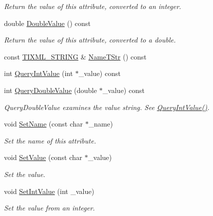 \begin{DoxyCompactItemize}
\begin{DoxyCompactList}\small\item\em Return the value of this attribute, converted to an integer. \end{DoxyCompactList}\item 
double \hyperlink{class_ti_xml_attribute_a2880ddef53fc7522c99535273954d230}{Double\-Value} () const 
\begin{DoxyCompactList}\small\item\em Return the value of this attribute, converted to a double. \end{DoxyCompactList}\item 
const \hyperlink{tinyxml_8h_a92bada05fd84d9a0c9a5bbe53de26887}{T\-I\-X\-M\-L\-\_\-\-S\-T\-R\-I\-N\-G} \& \hyperlink{class_ti_xml_attribute_a64cee17bceb8232eb0736d26dd082d79}{Name\-T\-Str} () const 
\item 
int \hyperlink{class_ti_xml_attribute_ad6c93088ee21af41a107931223339344}{Query\-Int\-Value} (int $\ast$\-\_\-value) const 
\item 
int \hyperlink{class_ti_xml_attribute_ac87b2a8489906a5d7aa2875f20be3513}{Query\-Double\-Value} (double $\ast$\-\_\-value) const 
\begin{DoxyCompactList}\small\item\em Query\-Double\-Value examines the value string. See \hyperlink{class_ti_xml_attribute_ad6c93088ee21af41a107931223339344}{Query\-Int\-Value()}. \end{DoxyCompactList}\item 
void \hyperlink{class_ti_xml_attribute_ab7fa3d21ff8d7c5764cf9af15b667a99}{Set\-Name} (const char $\ast$\-\_\-name)
\begin{DoxyCompactList}\small\item\em Set the name of this attribute. \end{DoxyCompactList}\item 
void \hyperlink{class_ti_xml_attribute_a2dae44178f668b3cb48101be4f2236a0}{Set\-Value} (const char $\ast$\-\_\-value)
\begin{DoxyCompactList}\small\item\em Set the value. \end{DoxyCompactList}\item 
void \hyperlink{class_ti_xml_attribute_a7e065df640116a62ea4f4b7da5449cc8}{Set\-Int\-Value} (int \-\_\-value)
\begin{DoxyCompactList}\small\item\em Set the value from an integer. \end{DoxyCompactList}\item 

\end{DoxyCompactItemize}
